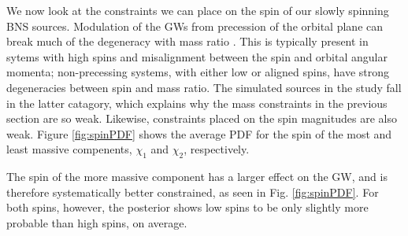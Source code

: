 We now look at the constraints we can place on the spin of our slowly spinning BNS sources.  Modulation of the GWs from precession of the orbital plane can break much of the degeneracy with mass ratio \citep{Vecchio_2004,Lang_2006,Vitale_2014,Chatziioannou_2014}. This is typically present in sytems with high spins and misalignment between the spin and orbital angular momenta; non-precessing systems, with either low or aligned spins, have strong degeneracies between spin and mass ratio.  The simulated sources in the study fall in the latter catagory, which explains why the mass constraints in the previous section are so weak.  Likewise, constraints placed on the spin magnitudes are also weak.  Figure \ref{fig:spinPDF} shows the average PDF for the spin of the most and least massive compenents, $\chi_1$ and $\chi_2$, respectively.

The spin of the more massive component has a larger effect on the GW, and is therefore systematically better constrained, as seen in Fig. \ref{fig:spinPDF}.  For both spins, however, the posterior shows low spins to be only slightly more probable than high spins, on average.
